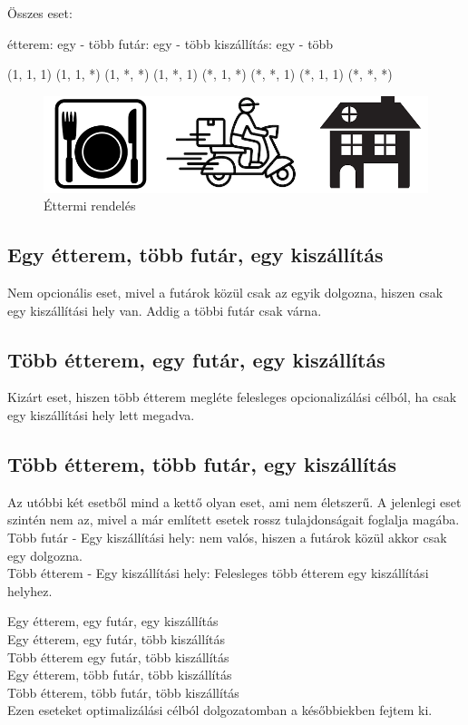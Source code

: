 

Összes eset:

étterem: egy - több
futár: egy - több
kiszállítás: egy - több

(1, 1, 1)
(1, 1, *)
(1, *, *)
(1, *, 1)
(*, 1, *)
(*, *, 1)
(*, 1, 1)
(*, *, *)


\begin{figure}[h!]
\centering
\includegraphics[scale=0.5]{images/complexModel.png}
\caption{Éttermi rendelés}
\label{fig:generalModel}
\end{figure}


\subsection{
Egy étterem, több futár, egy kiszállítás
}

Nem opcionális eset, mivel a futárok közül csak az egyik dolgozna, hiszen csak egy kiszállítási hely van. Addig a többi futár csak várna.

\subsection{
Több étterem, egy futár, egy kiszállítás
}

Kizárt eset, hiszen több étterem megléte felesleges opcionalizálási célból, ha csak egy kiszállítási hely lett megadva.

\subsection{
Több étterem, több futár, egy kiszállítás
}

Az utóbbi két esetből mind a kettő olyan eset, ami nem életszerű. A jelenlegi eset szintén nem az, mivel a már említett esetek rossz tulajdonságait foglalja magába. \\ 
Több futár - Egy kiszállítási hely: nem valós, hiszen a futárok közül akkor csak egy dolgozna. \\
Több étterem - Egy kiszállítási hely: Felesleges több étterem egy kiszállítási helyhez.


Egy étterem, egy futár, egy kiszállítás\\
Egy étterem, egy futár, több kiszállítás\\
Több étterem egy futár, több kiszállítás\\
Egy étterem, több futár, több kiszállítás\\
Több étterem, több futár, több kiszállítás\\
Ezen eseteket optimalizálási célból dolgozatomban a későbbiekben fejtem ki.
